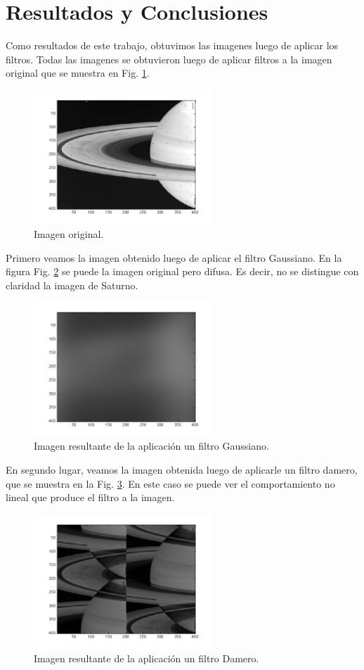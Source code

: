 \documentclass[11pt,a4paper]{emulateapj}
\begin{document}
\section{Resultados y Conclusiones}
\label{sec:resultadosyconclusiones}
Como resultados de este trabajo, obtuvimos las imagenes luego de aplicar los filtros. Todas las imagenes se obtuvieron luego de aplicar filtros a la imagen original que se muestra en Fig. \ref{fig:imagensaturno}. 
\begin{figure}[ht!]
     \includegraphics[width=254px]{images/saturno.png}
      \caption[Imagen original de Saturno.]{Imagen original.}
     \label{fig:imagensaturno}
\end{figure} 
Primero veamos la imagen obtenido luego de aplicar el filtro Gaussiano. En la figura Fig. \ref{fig:imagengaussiana} se puede la imagen original pero difusa. Es decir, no se distingue con claridad la imagen de Saturno.
\begin{figure}[ht!]
     \includegraphics[width=254px]{images/gaussiano.png}
       \caption{Imagen resultante de la aplicación un filtro Gaussiano.}
     \label{fig:imagengaussiana}
\end{figure} 
En segundo lugar, veamos la imagen obtenida luego de aplicarle un filtro damero, que se muestra en la Fig. \ref{fig:imagendamero}. En este caso se puede ver el comportamiento no lineal que produce el filtro a la imagen.
\begin{figure}[ht!]
     \includegraphics[width=254px]{images/damero.png}
       \caption{Imagen resultante de la aplicación un filtro Damero.}
     \label{fig:imagendamero}
\end{figure} 
\end{document}
